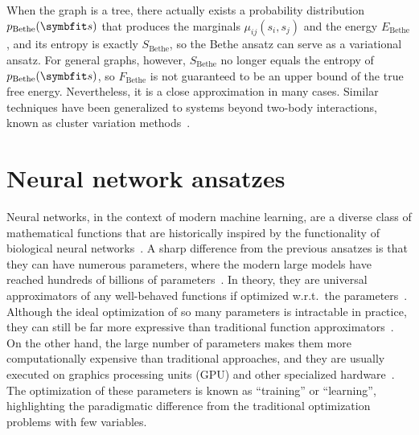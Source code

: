When the graph is a tree, there actually exists a probability distribution $p_\text{Bethe}(\vs)$ that produces the marginals $\mu_{i j}(s_i, s_j)$ and the energy $E_\text{Bethe}$, and its entropy is exactly $S_\text{Bethe}$, so the Bethe ansatz can serve as a variational ansatz. For general graphs, however, $S_\text{Bethe}$ no longer equals the entropy of $p_\text{Bethe}(\vs)$, so $F_\text{Bethe}$ is not guaranteed to be an upper bound of the true free energy. Nevertheless, it is a close approximation in many cases. Similar techniques have been generalized to systems beyond two-body interactions, known as cluster variation methods~\cite{pelizzola2005cluster}.

\section{Neural network ansatzes}


Neural networks, in the context of modern machine learning, are a diverse class of mathematical functions that are historically inspired by the functionality of biological neural networks~\cite{mackay2003information, goodfellow2016deep}. A sharp difference from the previous ansatzes is that they can have numerous parameters, where the modern large models have reached hundreds of billions of parameters~\cite{brown2020language}. In theory, they are universal approximators of any well-behaved functions if optimized w.r.t.\ the parameters~\cite{hornik1989multilayer}. Although the ideal optimization of so many parameters is intractable in practice, they can still be far more expressive than traditional function approximators~\cite{sontag1998vc}. On the other hand, the large number of parameters makes them more computationally expensive than traditional approaches, and they are usually executed on graphics processing units (GPU) and other specialized hardware~\cite{chen2020survey}. The optimization of these parameters is known as ``training'' or ``learning'', highlighting the paradigmatic difference from the traditional optimization problems with few variables.

